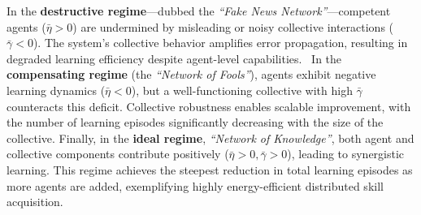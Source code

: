 \documentclass[12pt]{article}
\renewcommand{\emph}[1]{\textit{#1}}
\begin{document}
In the \textbf{destructive regime}---dubbed the \emph{``Fake News Network''}---competent agents (\(\bar{\eta} > 0\)) are undermined by misleading or noisy collective interactions (\(\bar{\gamma} < 0\)). The system's collective behavior amplifies error propagation, resulting in degraded learning efficiency despite agent-level capabilities. %
~In the \textbf{compensating regime} (the \emph{``Network of Fools''}), agents exhibit negative learning dynamics (\(\bar{\eta} < 0\)), but a well-functioning collective with high $\bar{\gamma}$ counteracts this deficit. Collective robustness enables scalable improvement, with the number of learning episodes significantly decreasing with the size of the collective. Finally, in the \textbf{ideal regime}, \emph{``Network of Knowledge''}, both agent and collective components contribute positively (\(\bar{\eta} > 0, \bar{\gamma} > 0\)), leading to synergistic learning. This regime achieves the steepest reduction in total learning episodes as more agents are added, exemplifying highly energy-efficient distributed skill acquisition.

\end{document}
